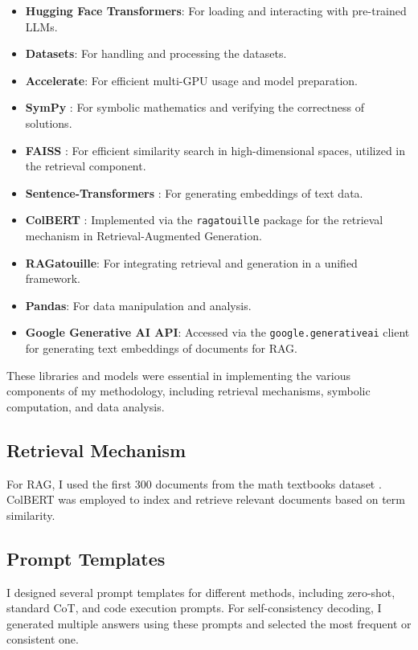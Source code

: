 \documentclass[11pt,a4paper]{article}
\begin{document}
\begin{itemize}[noitemsep,nolistsep]
    \item \textbf{Hugging Face Transformers}: For loading and interacting with pre-trained LLMs.
    \item \textbf{Datasets}: For handling and processing the datasets.
    \item \textbf{Accelerate}: For efficient multi-GPU usage and model preparation.
    \item \textbf{SymPy} \cite{meurer2017sympy}: For symbolic mathematics and verifying the correctness of solutions.
    \item \textbf{FAISS} \cite{johnson2019billion}: For efficient similarity search in high-dimensional spaces, utilized in the retrieval component.
    \item \textbf{Sentence-Transformers} \cite{reimers2019sentencebertsentenceembeddingsusing}: For generating embeddings of text data.
    \item \textbf{ColBERT} \cite{khattab2020colbert}: Implemented via the \texttt{ragatouille} package for the retrieval mechanism in Retrieval-Augmented Generation.
    \item \textbf{RAGatouille}: For integrating retrieval and generation in a unified framework.
    \item \textbf{Pandas}: For data manipulation and analysis.
    \item \textbf{Google Generative AI API}: Accessed via the \texttt{google.generativeai} client for generating text embeddings of documents for RAG.
\end{itemize}

These libraries and models were essential in implementing the various components of my methodology, including retrieval mechanisms, symbolic computation, and data analysis.

\subsection{Retrieval Mechanism}
For RAG, I used the first 300 documents from the math textbooks dataset \cite{wentingzhao2023mathtextbooks}. ColBERT \cite{khattab2020colbert} was employed to index and retrieve relevant documents based on term similarity.

\subsection{Prompt Templates}
I designed several prompt templates for different methods, including zero-shot, standard CoT, and code execution prompts. For self-consistency decoding, I generated multiple answers using these prompts and selected the most frequent or consistent one.
\end{document}
